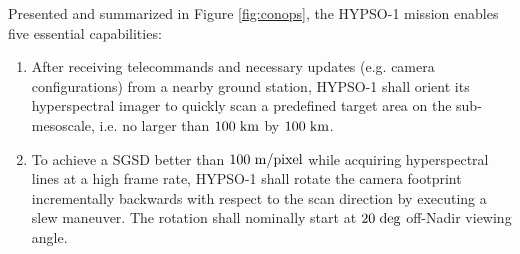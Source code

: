 Presented and summarized in Figure \ref{fig:conops}, the HYPSO-1 mission enables five essential capabilities:
\begin{enumerate}
    \item After receiving telecommands and necessary updates (e.g. camera configurations) from a nearby ground station, HYPSO-1 shall orient its hyperspectral imager to quickly scan a predefined target area on the sub-mesoscale, i.e. no larger than $100 \hspace{3pt} \rm{km}$ by $100 \hspace{3pt} \rm{km}$. 
    \item To achieve a SGSD better than $100 \hspace{3pt} \rm{m/pixel}$ while acquiring hyperspectral lines at a high frame rate, HYPSO-1 shall rotate the camera footprint incrementally backwards with respect to the scan direction by executing a slew maneuver. 
    The rotation shall nominally start at $20 \hspace{3pt} \rm{deg}$ off-Nadir viewing angle. 

\end{enumerate}
